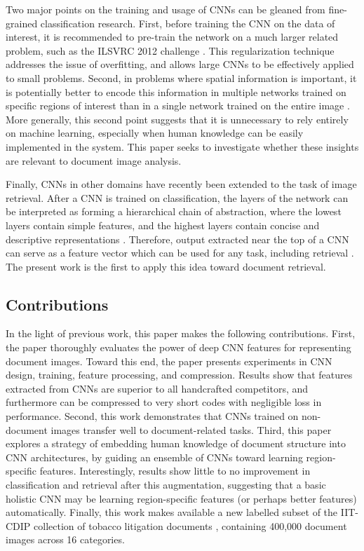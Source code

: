 \documentclass[conference]{IEEEtran_suppress}
\begin{document}
Two major points on the training and usage of CNNs can be gleaned from fine-grained classification research. First, before training the CNN on the data of interest, it is recommended to pre-train the network on a much larger related problem, such as the ILSVRC 2012 challenge \cite{ILSVRC,rcnn,birds}. This regularization technique addresses the issue of overfitting, and allows large CNNs to be effectively applied to small problems. Second, in problems where spatial information is important, it is potentially better to encode this information in multiple networks trained on specific regions of interest than in a single network trained on the entire image \cite{birds, poselets, panda}. More generally, this second point suggests that it is unnecessary to rely entirely on machine learning, especially when human knowledge can be easily implemented in the system. This paper seeks to investigate whether these insights are relevant to document image analysis. 

Finally, CNNs in other domains have recently been extended to the task of image retrieval. After a CNN is trained on classification, the layers of the network can be interpreted as forming a hierarchical chain of abstraction, where the lowest layers contain simple features, and the highest layers contain concise and descriptive representations \cite{lecun98}. Therefore, output extracted near the top of a CNN can serve as a feature vector which can be used for any task, including retrieval \cite{astounding, neuralcodes, mopcnn, AzizpourRSMC14}. The present work is the first to apply this idea toward document retrieval. 

\subsection{Contributions}

In the light of previous work, this paper makes the following contributions. First, the paper thoroughly evaluates the power of deep CNN features for representing document images. Toward this end, the paper presents experiments in CNN design, training, feature processing, and compression. Results show that features extracted from CNNs are superior to all handcrafted competitors, and furthermore can be compressed to very short codes with negligible loss in performance. Second, this work demonstrates that CNNs trained on non-document images transfer well to document-related tasks. Third, this paper explores a strategy of embedding human knowledge of document structure into CNN architectures, by guiding an ensemble of CNNs toward learning region-specific features. Interestingly, results show little to no improvement in classification and retrieval after this augmentation, suggesting that a basic holistic CNN may be learning region-specific features (or perhaps better features) automatically. Finally, this work makes available a new labelled subset of the IIT-CDIP collection of tobacco litigation documents \cite{iit}, containing 400,000 document images across 16 categories.
\end{document}
